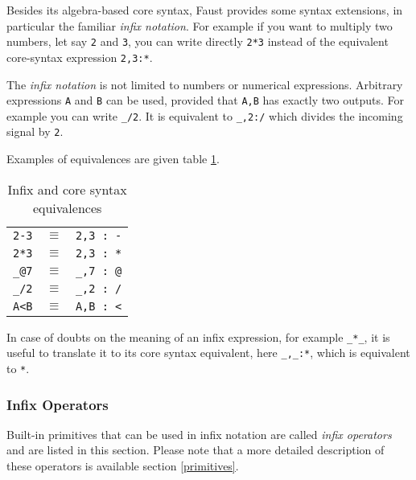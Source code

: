Besides its algebra-based core syntax, Faust provides some syntax extensions, in particular the familiar \emph{infix notation}. For example if you want to multiply two numbers, let say \lstinline'2' and \lstinline'3', you can write directly \lstinline'2*3' instead of the equivalent core-syntax expression \lstinline'2,3:*'.

The \emph{infix notation} is not limited to numbers or numerical expressions. Arbitrary expressions \lstinline'A' and \lstinline'B' can be used, provided that \lstinline'A,B' has exactly two outputs. For example you can write \lstinline'_/2'. It is equivalent to \lstinline'_,2:/' which divides the incoming signal by \lstinline'2'. 

Examples of equivalences are given table \ref{tab:infixrules}.

\begin{table}[h]
	\begin{center}
	\begin{tabular}{|rcl|}
	\hline
	\lstinline'2-3' & $\equiv$ & \lstinline'2,3 : -'\\
	\lstinline'2*3' & $\equiv$ & \lstinline'2,3 : *'\\
	\lstinline'_@7' & $\equiv$ & \lstinline'_,7 : @'\\
	\lstinline'_/2' & $\equiv$ & \lstinline'_,2 : /'\\
	\lstinline'A<B' & $\equiv$ & \lstinline'A,B : <'\\
	\hline
	\end{tabular}
	\end{center}
	\caption{Infix and core syntax equivalences}
	\label{tab:infixrules}
\end{table}

In case of doubts on the meaning of an infix expression, for example \lstinline'_*_', it is useful to translate it to its core syntax equivalent, here \lstinline'_,_:*', which is equivalent to \lstinline'*'.
	
\subsubsection{Infix Operators}

Built-in primitives that can be used in infix notation are called \emph{infix operators} and are listed in this section. Please note that a more detailed description of these operators is available section \ref{primitives}. 


